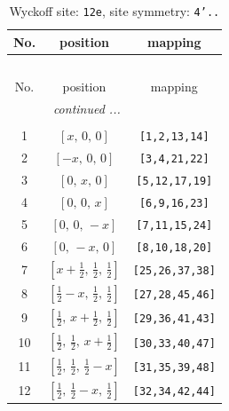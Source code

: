 \documentclass[fleqn,8pt]{jsarticle}
\begin{document}
\begin{longtable}{ccc}
\caption{Wyckoff site: {\tt 12e}, site symmetry: {\tt 4'..}}
 \\
 \hline \hline
No. & position & mapping \\ \hline \endfirsthead

\multicolumn{2}{l}{\tablename\ \thetable{}} \\
 \hline \hline
No. & position & mapping \\ \hline \endhead

 \hline \hline
\multicolumn{2}{r}{\footnotesize\it continued ...} \\ \endfoot

 \hline \hline
\multicolumn{2}{r}{} \\ \endlastfoot

1 & $\left[ x,\, 0,\, 0 \right]$ & {\tt [1,2,13,14]} \\ \hline
2 & $\left[ - x,\, 0,\, 0 \right]$ & {\tt [3,4,21,22]} \\ \hline
3 & $\left[ 0,\, x,\, 0 \right]$ & {\tt [5,12,17,19]} \\ \hline
4 & $\left[ 0,\, 0,\, x \right]$ & {\tt [6,9,16,23]} \\ \hline
5 & $\left[ 0,\, 0,\, - x \right]$ & {\tt [7,11,15,24]} \\ \hline
6 & $\left[ 0,\, - x,\, 0 \right]$ & {\tt [8,10,18,20]} \\ \hline
7 & $\left[ x + \frac{1}{2},\, \frac{1}{2},\, \frac{1}{2} \right]$ & {\tt [25,26,37,38]} \\ \hline
8 & $\left[ \frac{1}{2} - x,\, \frac{1}{2},\, \frac{1}{2} \right]$ & {\tt [27,28,45,46]} \\ \hline
9 & $\left[ \frac{1}{2},\, x + \frac{1}{2},\, \frac{1}{2} \right]$ & {\tt [29,36,41,43]} \\ \hline
10 & $\left[ \frac{1}{2},\, \frac{1}{2},\, x + \frac{1}{2} \right]$ & {\tt [30,33,40,47]} \\ \hline
11 & $\left[ \frac{1}{2},\, \frac{1}{2},\, \frac{1}{2} - x \right]$ & {\tt [31,35,39,48]} \\ \hline
12 & $\left[ \frac{1}{2},\, \frac{1}{2} - x,\, \frac{1}{2} \right]$ & {\tt [32,34,42,44]} \\
\end{longtable}
\renewcommand{\arraystretch}{1.2}
\end{document}

